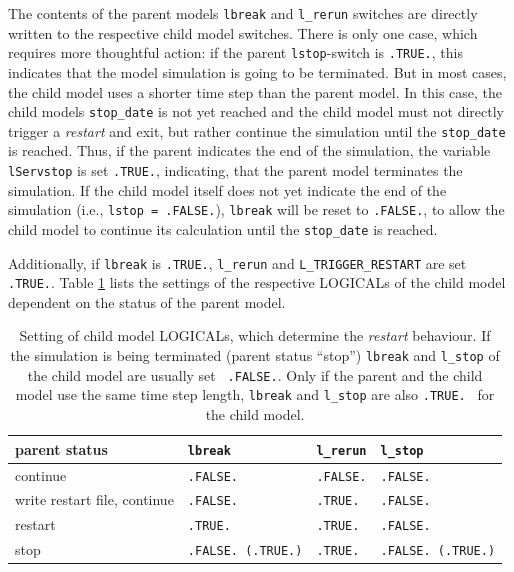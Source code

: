 \documentclass[11pt,twoside]{article}
\newcommand{\blockcode}{\ttfamily\color{OliveGreen}\par}
\begin{document}
 The contents of the parent models \verb|lbreak| and \verb|l_rerun|
switches are directly written to the respective child model switches. 
There is only one case, which requires more thoughtful action:
if the parent \verb|lstop|-switch is \verb|.TRUE.|, this indicates that the
model simulation is going to be terminated. But in most cases, the
child model uses a shorter time step than the parent model. In this
case, the child models \verb|stop_date| is not yet reached and the
child model must not directly trigger a {\it restart} and exit, but
rather continue the simulation until the \verb|stop_date| is reached. 
Thus, if the parent indicates the end of the simulation, the
variable \verb|lServstop| is set \verb|.TRUE.|, indicating, that the
parent model terminates the simulation. If the child model itself
does not yet indicate the end of the simulation (i.e., \verb|lstop = .FALSE.|),
\verb|lbreak| will be reset to \verb|.FALSE.|, to allow  the child
model to continue its calculation until the \verb|stop_date| is reached.


Additionally, if \verb|lbreak|  is \verb|.TRUE.|,
\verb|l_rerun| and \verb|L_TRIGGER_RESTART| are set \verb|.TRUE.|.
Table \ref{tab:logrestart} lists the settings of the respective {\footnotesize
LOGICALs} of the child model dependent on the status of the parent
model. 
\begin{table} 
\begin{center}
\caption{Setting of child model {\footnotesize LOGICALs}, which
 determine the {\it restart} behaviour. If the simulation is being
 terminated (parent status ``stop'') 
{\tt lbreak} and {\tt l\_stop} of the child model are usually set {\tt
.FALSE.}. Only if the parent and the child model use the same time
step length, {\tt lbreak} and {\tt l\_stop} are also  {\tt .TRUE. }
for the child model.\label{tab:logrestart}}
\vspace*{0.2cm}
{\blockcode
\begin{tabular}{llll}\hline
parent status & {\tt lbreak}  & {\tt l\_rerun}  & {\tt l\_stop} \\ \hline
continue & {\tt .FALSE.} &  {\tt .FALSE.} &  {\tt .FALSE.}  \\
write restart file, continue & {\tt .FALSE.} &  {\tt .TRUE. } &  {\tt .FALSE.}  \\
restart  & {\tt .TRUE. } &  {\tt .TRUE. } &  {\tt .FALSE.} \\
stop     & {\tt .FALSE. (.TRUE.)}  &  {\tt .TRUE. } &  {\tt .FALSE. (.TRUE.)} \\
\hline
\end{tabular}
}
\end{center}
\end{table}
\end{document}
